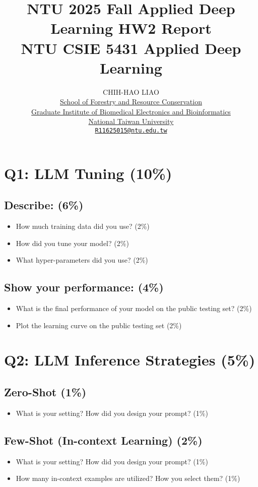 \documentclass{article}
\title{
  NTU 2025 Fall Applied Deep Learning HW2 Report \\
  \vspace{1em}
  \small{\normalfont NTU CSIE 5431 Applied Deep Learning}
}
\author{
  CHIH-HAO LIAO \\
  {\hypersetup{urlcolor=black}\href{https://www.fo.ntu.edu.tw/}{School of Forestry and Resource Conservation}}\\
  {\hypersetup{urlcolor=black}\href{https://www.bebi.ntu.edu.tw/}{Graduate Institute of Biomedical Electronics and Bioinformatics}}\\
  {\hypersetup{urlcolor=black}\href{https://www.ntu.edu.tw/}{National Taiwan University}}\\
  {\hypersetup{urlcolor=black}\href{mailto:R11625015@ntu.edu.tw}{\texttt{R11625015@ntu.edu.tw}}} \\
}
\begin{document}
\maketitle

\section{Q1: LLM Tuning (10\%)}
\subsection{Describe: (6\%)}
\begin{itemize}
    \item How much training data did you use? (2\%)
    \item How did you tune your model? (2\%)
    \item What hyper-parameters did you use? (2\%)
\end{itemize}

\subsection{Show your performance: (4\%)}
\begin{itemize}
    \item What is the final performance of your model on the public testing set? (2\%)
    \item Plot the  learning curve on the public testing set (2\%)
\end{itemize}

\section{Q2: LLM Inference Strategies (5\%)}
\subsection{Zero-Shot (1\%)}
\begin{itemize}
    \item What is your setting? How did you design your prompt? (1\%)
\end{itemize}

\subsection{Few-Shot (In-context Learning) (2\%)}
\begin{itemize}
    \item What is your setting? How did you design your prompt? (1\%)
    \item How many in-context examples are utilized? How you select them? (1\%)
\end{itemize}
\end{document}
